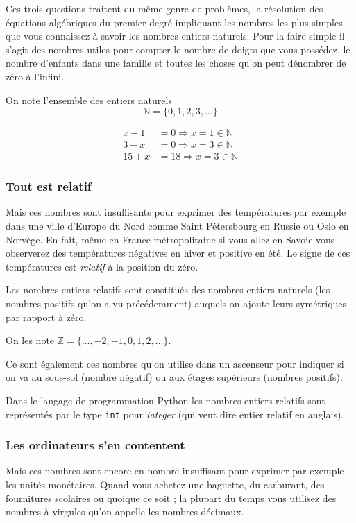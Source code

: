 \documentclass[a4paper, 11pt, twoside]{article}
\newcommand{\E}[1]{\mathbb{#1}}
\begin{document}
Ces trois questions traitent du même genre de problèmes, la
résolution des équations algébriques du premier degré impliquant
les nombres les plus simples que vous connaissez à savoir les
nombres entiers naturels. Pour la faire simple il s'agit des
nombres utiles pour compter le nombre de doigts que vous possédez,
le nombre d'enfants dans une famille et toutes les choses qu'on
peut dénombrer de zéro à l'infini.

On note l'ensemble des entiers naturels \[\E{N} = \{0, 1, 2, 3,\dots
   \}\]


\begin{align*}
x - 1 &= 0 \Rightarrow x = 1\in\E{N}\\
3 - x &= 0 \Rightarrow x = 3\in\E{N}\\
15 + x&= 18\Rightarrow x = 3\in\E{N}
\end{align*}

\subsubsection{Tout est relatif}
\label{sec:org4d7e26c}

Mais ces nombres sont insuffisants pour exprimer des températures
par exemple dans une ville d'Europe du Nord comme Saint Pétersbourg
en Russie ou Oslo en Norvège. En fait, même en France
métropolitaine si vous allez en Savoie vous observerez des
températures négatives en hiver et positive en été. Le signe de ces
températures est \emph{relatif} à la position du zéro.

Les nombres entiers relatifs sont constitués des nombres entiers
naturels (les nombres positifs qu'on a vu précédemment) auquels on
ajoute leurs symétriques par rapport à zéro.

On les note \(\E{Z} = \{\dots, -2, -1, 0, 1, 2, \dots\}\).

Ce sont également ces nombres qu'on utilise dans un ascenseur pour
indiquer si on va au sous-sol (nombre négatif) ou aux étages
supérieurs (nombres positifs).

Dans le langage de programmation Python les nombres entiers
relatifs sont représentés par le type \texttt{int} pour \emph{integer} (qui
veut dire entier relatif en anglais).

\subsubsection{Les ordinateurs s'en contentent}
\label{sec:org262180f}

Mais ces nombres sont encore en nombre insuffisant pour exprimer
par exemple les unités monétaires. Quand vous achetez une baguette,
du carburant, des fournitures scolaires ou quoique ce soit ; la
plupart du temps vous utilisez des nombres à virgules qu'on appelle
les nombres décimaux.
\end{document}

